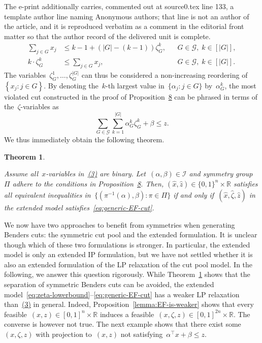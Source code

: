 \documentclass[10pt,a4paper]{amsart}
\newcommand{\R}{\mathds{R}}
\newcommand{\B}[1]{\{0,1\}^{#1}}
\newcommand{\fixed}[1]{\hat{ #1 }}
\newcommand{\sprod}[2]{#1^\top #2}
\newcommand{\brackets}[1]{\left\{ #1 \right\}}
\newtheorem{theorem}{Theorem}
\theoremstyle{definition}
\begin{document}
 The e-print additionally carries, commented out at source0.tex line 133, a template author line naming Anonymous authors; that line is not an author of the article, and it is reproduced verbatim as a comment in the editorial front matter so that the author record of the delivered unit is complete.
\setcounter{equation}{8}
\setcounter{theorem}{8}
\begin{align}
  \sum_{j \in G} x_j &\leq k - 1 + \left(|G| - (k - 1)\right)\zeta^k_G, && G \in \mathcal{G},\; k \in [|G|],\label{eq:zeta-lowerbound}\\
  k \cdot \zeta^k_G &\leq \sum_{j \in G} x_j, && G \in \mathcal{G},\; k \in [|G|].\label{eq:zeta-upperbound}
\end{align}
%
The variables~$\zeta^1_{G}, \dots, \zeta^{|G|}_{G}$ can thus be considered a non-increasing reordering of~$\brackets{x_{j}: j \in G}$.
By denoting the~$k$-th largest value in~$\{\alpha_j : j \in G\}$ by~$\alpha^k_{G}$, the most violated cut constructed in the proof of Proposition~\href{https://arxiv.org/abs/2511.22251v4}{8} can be phrased in terms of the~$\zeta$-variables as
%
\begin{equation}
  \sum_{G\in \mathcal{G}} \sum_{k = 1}^{|G|} \alpha^k_{G} \zeta^k_{G} +\beta \leq z. \label{eq:generic-EF-cut}
\end{equation}
%
We thus immediately obtain the following theorem.
%
\begin{theorem}
  \label{thm:EF-works}

  Assume all~$x$-variables in~\href{https://arxiv.org/abs/2511.22251v4}{(3)} are binary.
  Let~$(\alpha,\beta) \in \mathcal{I}$ and symmetry group~$\Pi$ adhere to the conditions in Proposition~\href{https://arxiv.org/abs/2511.22251v4}{8}.
  Then, $(\fixed{x},\fixed{z}) \in \B{n} \times \R$ satisfies all equivalent inequalities in~$\{(\pi^{-1}(\alpha),\beta) : \pi \in \Pi\}$ if and only if~$(\fixed{x},\fixed{\zeta},\fixed{z})$ in the extended model satisfies~\eqref{eq:generic-EF-cut}.
\end{theorem}

\setcounter{theorem}{9}
%

We now have two approaches to benefit from symmetries when generating Benders cuts: the symmetric cut pool and the extended formulation.
It is unclear though which of these two formulations is stronger.
In particular, the extended model is only an extended IP formulation, but we have not settled whether it is also an extended formulation of the LP relaxation of the cut pool model.
In the following, we answer this question rigorously.
While Theorem~\ref{thm:EF-works} shows that the separation of symmetric Benders cuts can be avoided, the extended model~\eqref{eq:zeta-lowerbound}--\eqref{eq:generic-EF-cut} has a weaker LP relaxation than~\href{https://arxiv.org/abs/2511.22251v4}{(3)} in general.
Indeed, Proposition~\ref{lemma:EF-is-weaker} shows that every feasible~$(x, z)\in [0,1]^{n}\times\R$ induces a feasible~$(x, \zeta, z)\in[0,1]^{2n}\times\R$.
The converse is however not true.
The next example shows that there exist some~$(x,\zeta, z)$ with projection to~$(x,z)$ not satisfying~$\sprod{\alpha}{x} + \beta \leq z$.
\end{document}
